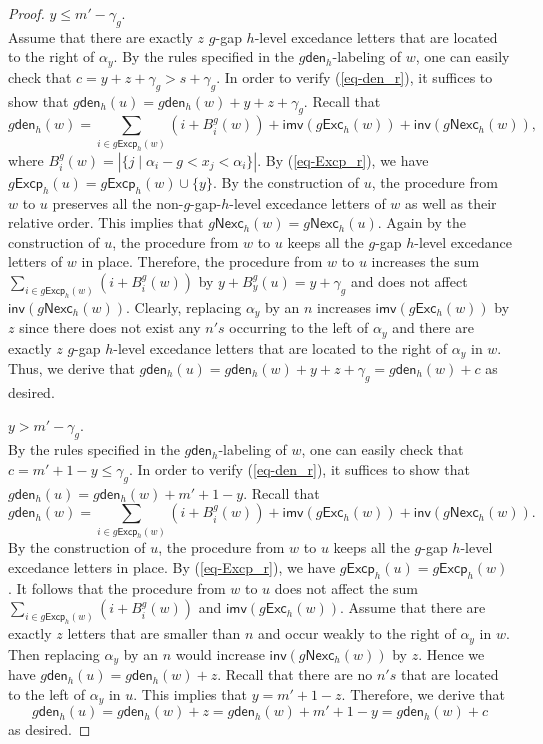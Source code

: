 \documentclass[10pt,a4paper]{amsart}
\def\Exc{\mathsf{Exc}}
\def\Excp{\mathsf{Excp}}
\def\Nexc{\mathsf{Nexc}}
\def\den{\mathsf{den}}
\def\imv{\mathsf{imv}}
\def\inv{\mathsf{inv}}
\begin{document}
\begin{proof}
 $y\leq  m'-\gamma_g$.\\
 Assume that there are exactly  $z$ $g$-gap $h$-level excedance letters that are located to the right of $\alpha_y$. 
By the rules   specified in the $g\den_h$-labeling of $w$,  one can easily check that $c=y+z+\gamma_g>s+\gamma_g$. In order to verify (\ref{eq-den_r}), it suffices to show that $g\den_h(u)=g\den_h(w)+y+z+\gamma_g$. 
Recall that 
$$
g\den_h(w)=\sum\limits_{i\in g\Excp_h(w)} (i+B^g_i(w)) +{\imv}(g\Exc_h(w))+{\inv}(g\Nexc_h (w)),
$$
	where $B^{g}_i(w)=|\{j \mid \alpha_i -g< x_j < \alpha_i\}|$. 
By (\ref{eq-Excp_r}), we have $g\Excp_h(u)=g\Excp_h(w)\cup \{y\}$.  By the construction of $u$, the procedure from $w$ to $u$ preserves all the non-$g$-gap-$h$-level excedance letters of $w$ as well as their relative order.  This implies that $g\Nexc_h(w)=g\Nexc_h(u)$.    Again by the construction of $u$, the procedure from $w$ to $u$ keeps all the $g$-gap $h$-level excedance letters of $w$ in place. 
Therefore, the procedure from $w$ to $u$  increases the sum 
$ 
\sum\limits_{i\in g\Excp_h(w)} (i+B^g_i(w))
$ by $y+B^g_y(u)=y+\gamma_g$ and does not affect ${\inv}(g\Nexc_h (w))$. Clearly, replacing $\alpha_y$ by an $n$ increases ${\imv}(g\Exc_h(w))$  by $z$ since there does not exist any $n's$ occurring to the left of $\alpha_y$ and there are exactly $z$ $g$-gap $h$-level excedance letters that are located to the right of $\alpha_y$ in $w$. Thus, we derive that $g\den_h(u)=g\den_h(w)+y+z+\gamma_g=g\den_h(w)+c$ as desired. 


 $y>  m'-\gamma_g$.\\
By the rules   specified in the $g\den_h$-labeling of $w$,  one can easily check that $c=m'+1-y\leq \gamma_g$. In order to verify (\ref{eq-den_r}), it suffices to show that $g\den_h(u)=g\den_h(w)+m'+1-y$. 
Recall that 
$$
g\den_h(w)=\sum\limits_{i\in g\Excp_h(w)} (i+B^g_i(w)) +{\imv}(g\Exc_h(w))+{\inv}(g\Nexc_h (w)).
$$
   By the construction of $u$, the procedure from $w$ to $u$ keeps all the $g$-gap $h$-level excedance letters in place.  By (\ref{eq-Excp_r}), we have $g\Excp_h(u)=g\Excp_h(w)$.  It follows that   the procedure from $w$ to $u$ does not affect the sum $\sum\limits_{i\in g\Excp_h(w)} (i+B^g_i(w))$ and $\imv(g\Exc_h(w))$.  
   Assume that there are exactly $z$ letters that are smaller than $n$  and   occur weakly to the  right of $\alpha_y$ in $w$. Then   replacing $\alpha_y$ by an $n$  would increase  ${\inv}(g\Nexc_h(w))$  by $z$. 
   Hence we have $g\den_h(u)=g\den_h(w)+z$. Recall that there are no $n's$ that are located  to the left of $\alpha_y$ in $u$. This implies that $y=m'+1-z$. Therefore, we derive that
   $$
   g\den_h(u)=g\den_h(w)+z=g\den_h(w)+m'+1-y=g\den_h(w)+c
   $$
   as desired.  
   

\end{proof}
\end{document}
